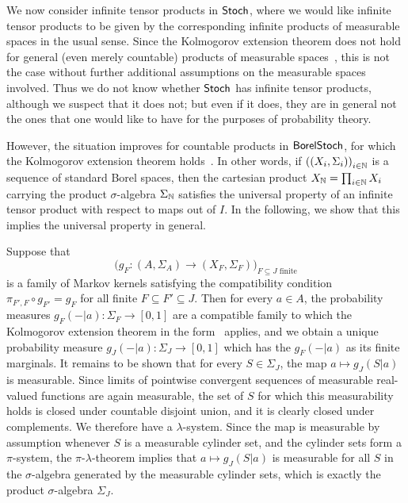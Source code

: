 \documentclass[11pt]{article}
\begin{document}
\begin{example}
	\label{infprods_stoch}
	We now consider infinite tensor products in $\operatorname{\mathsf{Stoch}}$, where we would like infinite tensor products to be given by the corresponding infinite products of measurable spaces in the usual sense. Since the Kolmogorov extension theorem does not hold for general (even merely countable) products of measurable spaces~\cite{AJ}, this is not the case without further additional assumptions on the measurable spaces involved. Thus we do not know whether $\operatorname{\mathsf{Stoch}}$ has infinite tensor products, although we suspect that it does not; but even if it does, they are in general not the ones that one would like to have for the purposes of probability theory.

	However, the situation improves for countable products in $\operatorname{\mathsf{BorelStoch}}$, for which the Kolmogorov extension theorem holds~\cite[Theorem~14.35]{klenke}. In other words, if $\left( (X_i, \Sigma_i) \right)_{i \in \mathbb{N}}$ is a sequence of standard Borel spaces, then the cartesian product $X_{\mathbb{N}} = \prod_{i \in \mathbb{N}} X_i$ carrying the product $\sigma$-algebra $\Sigma_{\mathbb{N}}$ satisfies the universal property of an infinite tensor product with respect to maps out of $I$. In the following, we show that this implies the universal property in general.

	Suppose that
	\[
		\Big( g_F : (A,\Sigma_A) \longrightarrow (X_F, \Sigma_F) \Big)_{F \subseteq J \text{ finite}}
	\]
	is a family of Markov kernels satisfying the compatibility condition $\pi_{F',F} \circ g_{F'} = g_F$ for all finite $F \subseteq F' \subseteq J$. Then for every $a \in A$, the probability measures $g_F(-|a) : \Sigma_F \to [0,1]$ are a compatible family to which the Kolmogorov extension theorem in the form~\cite[Theorem~14.35]{klenke} applies, and we obtain a unique probability measure $g_J(-|a) : \Sigma_J \to [0,1]$ which has the $g_F(-|a)$ as its finite marginals. It remains to be shown that for every $S \in \Sigma_J$, the map $a \mapsto g_J(S|a)$ is measurable. Since limits of pointwise convergent sequences of measurable real-valued functions are again measurable, the set of $S$ for which this measurability holds is closed under countable disjoint union, and it is clearly closed under complements. We therefore have a $\lambda$-system. Since the map is measurable by assumption whenever $S$ is a measurable cylinder set, and the cylinder sets form a $\pi$-system, the $\pi$-$\lambda$-theorem implies that $a \mapsto g_J(S|a)$ is measurable for all $S$ in the $\sigma$-algebra generated by the measurable cylinder sets, which is exactly the product $\sigma$-algebra $\Sigma_J$.


\end{example}
\end{document}
